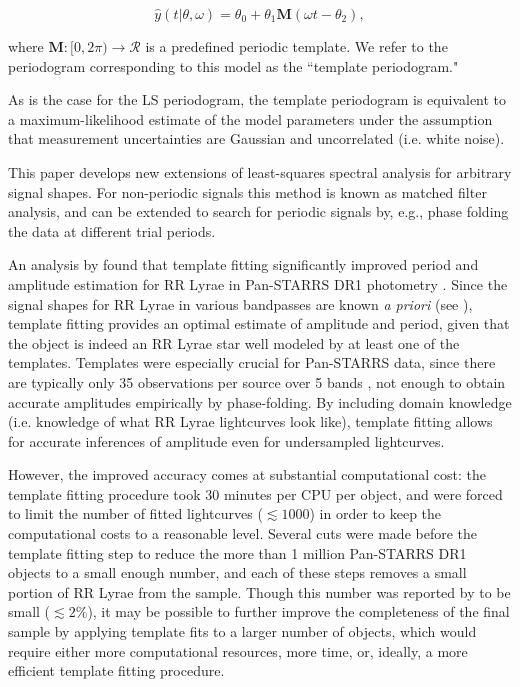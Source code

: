 \documentclass[apj]{emulateapj}
\begin{document}
\begin{equation}
    \hat{y}(t|\theta, \omega) = \theta_0 + \theta_1 \mathbf{M}(\omega t - \theta_2),
\end{equation}

where $\mathbf{M}:[0, 2\pi)\rightarrow \mathcal{R}$ is a predefined periodic template.
We refer to the periodogram corresponding to this model as the ``template periodogram."

As is the case for the LS periodogram, the template periodogram
is equivalent to a maximum-likelihood estimate of the model parameters under the assumption that
measurement uncertainties are Gaussian and uncorrelated (i.e. white noise).

This paper develops new extensions of least-squares spectral analysis for arbitrary
signal shapes. For non-periodic signals this method is known as matched filter analysis,
and can be extended to search for periodic signals by, e.g., phase folding the data
at different trial periods.

An analysis by \cite{Sesar_etal_2016} found that template fitting significantly improved
period and amplitude estimation for RR Lyrae in Pan-STARRS DR1 photometry \citep{PanSTARRS}. Since the signal
shapes for RR Lyrae in various bandpasses are known \emph{a priori} (see \cite{Sesar_etal_2010}),
template fitting provides an optimal estimate of amplitude and period,
given that the object is indeed an RR Lyrae star well modeled by at least one of the templates.
Templates were especially crucial for Pan-STARRS data, since there are typically only
35 observations per source over 5 bands \citep{Hernitschek_etal_2016}, not enough to obtain
accurate amplitudes empirically by phase-folding. By including domain knowledge (i.e. knowledge of what RR Lyrae
lightcurves look like), template fitting allows for accurate inferences of amplitude even
for undersampled lightcurves.

However, the improved accuracy comes at substantial computational cost: the template fitting
procedure took 30 minutes per CPU per object, and \cite{Sesar_etal_2016} were forced to limit
the number of fitted lightcurves ($\lesssim 1000$) in order to keep the computational costs
to a reasonable level. Several cuts were made before the template fitting step to reduce the
more than 1 million Pan-STARRS DR1 objects to a small enough number, and each of these steps
removes a small portion of RR Lyrae from the sample. Though this number was reported by
\cite{Sesar_etal_2016} to be small ($\lesssim 2\%$), it may be possible to further improve
the completeness of the final sample by applying template fits to a larger number of objects,
which would require either more computational resources, more time, or, ideally, a more efficient
template fitting procedure.
\end{document}
